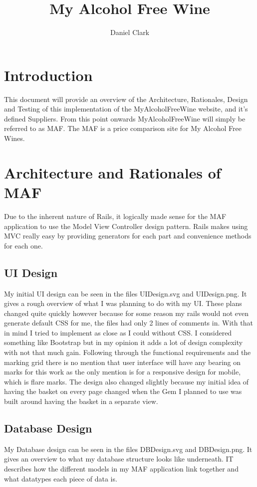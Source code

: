 \documentclass[11pt]{article}
\title{\textbf{My Alcohol Free Wine}}
\author{Daniel Clark}
\date{}
\begin{document}
\maketitle

\section{Introduction}

This document will provide an overview of the Architecture, Rationales, Design and Testing of this implementation of the MyAlcoholFreeWine website, and it's defined Suppliers. 
From this point onwards MyAlcoholFreeWine will simply be referred to as MAF.
The MAF is a price comparison site for My Alcohol Free Wines.

\section{Architecture and Rationales of MAF}
Due to the inherent nature of Rails, it logically made sense for the MAF application to use the Model View Controller design pattern. Rails makes using MVC really easy by providing generators for each part and convenience methods for each one.
\subsection{UI Design}
My initial UI design can be seen in the files UIDesign.svg and UIDesign.png. It gives a rough overview of what I was planning to do with my UI. These plans changed quite quickly however because for some reason my rails would not even generate default CSS for me, the files had only 2 lines of comments in. With that in mind I tried to implement as close as I could without CSS. I considered something like Bootstrap but in my opinion it adds a lot of design complexity with not that much gain. Following through the functional requirements and the marking grid there is no mention that user interface will have any bearing on marks for this work as the only mention is for a responsive design for mobile, which is flare marks.
The design also changed slightly because my initial idea of having the basket on every page changed when the Gem I planned to use was built around having the basket in a separate view.
\subsection{Database Design}
My Database design can be seen in the files DBDesign.svg and DBDesign.png. It gives an overview to what my database structure looks like underneath. IT describes how the different models in my MAF application link together and what datatypes each piece of data is.
\end{document}
